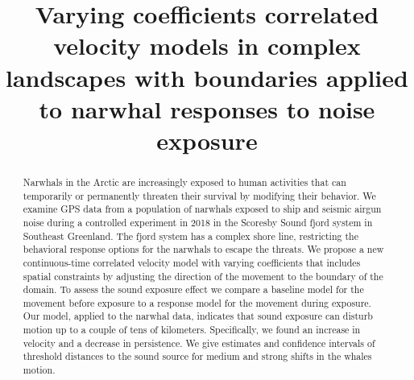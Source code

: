 \documentclass[aoas]{imsart}
\theoremstyle{definition}
\theoremstyle{remark}
\theoremstyle{remark}
\newcommand {\1}{\mathbb{1}}
\begin{document}
\begin{frontmatter}
\title{Varying coefficients correlated velocity models in complex landscapes with boundaries applied to narwhal responses to noise exposure}


\begin{abstract}
Narwhals in the Arctic are increasingly exposed to human activities that can temporarily or permanently threaten their survival by modifying their behavior. We examine GPS data from a population of narwhals exposed to ship and seismic airgun noise during a controlled experiment in 2018 in the Scoresby Sound fjord system in Southeast Greenland. The fjord system has a complex shore line, restricting the behavioral response options for the narwhals to escape the threats. We propose a new continuous-time correlated velocity model with varying coefficients that includes spatial constraints by adjusting the direction of the movement to the boundary of the domain. To assess the sound exposure effect we compare a baseline model for the movement before exposure to a response model for the movement during exposure. Our model, applied to the narwhal data, indicates that sound exposure can disturb motion up to a couple of tens of kilometers. Specifically, we found an increase in velocity and a decrease in persistence. We give estimates and confidence intervals of threshold distances to the sound source for medium and strong shifts in the whales motion.
\end{abstract}


\end{frontmatter}
\end{document}
